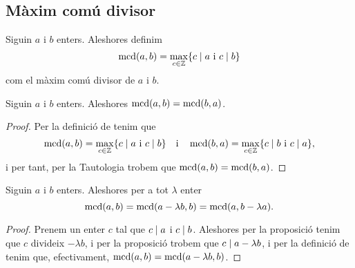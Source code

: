 \documentclass[../../Main.tex]{subfiles}
\begin{document}
	\subsection{Màxim comú divisor}
	\begin{definition}
		\label{def:màxim comú divisor}
		Siguin \(a\) i \(b\) enters. Aleshores definim
		\[\operatorname{mcd}(a,b)=\max_{c\in\mathbb{Z}}\{c\mathrel{|} a\text{ i }c\mathrel{|} b\}\]
		com el màxim comú divisor de \(a\) i \(b\).
	\end{definition}
	\begin{proposition}
		Siguin \(a\) i \(b\) enters. Aleshores \(\operatorname{mcd}(a,b)=\operatorname{mcd}(b,a)\).
		\begin{proof}
			Per la definició de  tenim que
			\[\operatorname{mcd}(a,b)=\max_{c\in\mathbb{Z}}\{c\mathrel{|} a\text{ i }c\mathrel{|} b\}\quad\text{i}\quad\operatorname{mcd}(b,a)=\max_{c\in\mathbb{Z}}\{c\mathrel{|} b\text{ i }c\mathrel{|} a\},\]
			i per tant, per la Tautologia  trobem que \(\operatorname{mcd}(a,b)=\operatorname{mcd}(b,a)\).
		\end{proof}
	\end{proposition}
	\begin{proposition}
		Siguin \(a\) i \(b\) enters. Aleshores per a tot \(\lambda\) enter
		\[\operatorname{mcd}(a,b)=\operatorname{mcd}(a-\lambda b,b)=\operatorname{mcd}(a,b-\lambda a).\]
		\begin{proof}
			Prenem un enter \(c\) tal que \(c\mathrel{|} a\) i \(c\mathrel{|} b\). Aleshores per la proposició  tenim que \(c\) divideix \(-\lambda b\), i per la proposició  trobem que \(c\mathrel{|} a-\lambda b\), i per la definició de  tenim que, efectivament, \(\operatorname{mcd}(a,b)=\operatorname{mcd}(a-\lambda b,b)\).
		\end{proof}
	\end{proposition}
\end{document}
